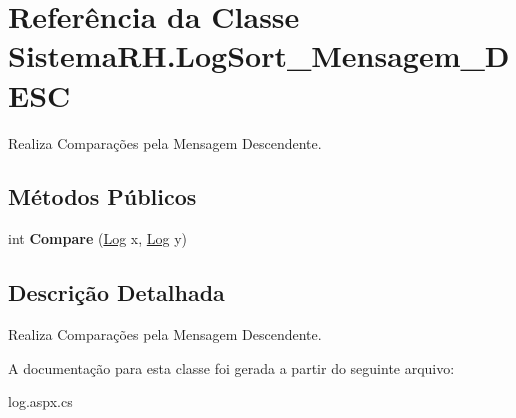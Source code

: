 \hypertarget{class_sistema_r_h_1_1_log_sort___mensagem___d_e_s_c}{
\section{Referência da Classe SistemaRH.LogSort\_\-Mensagem\_\-DESC}
\label{class_sistema_r_h_1_1_log_sort___mensagem___d_e_s_c}
}


Realiza Comparações pela Mensagem Descendente.  


\subsection*{Métodos Públicos}
\begin{DoxyCompactItemize}
\item 
\hypertarget{class_sistema_r_h_1_1_log_sort___mensagem___d_e_s_c_ad58529819fbe5728328110476bd18cb6}{
int {\bfseries Compare} (\hyperlink{class_sistema_r_h_1_1_log}{Log} x, \hyperlink{class_sistema_r_h_1_1_log}{Log} y)}
\label{class_sistema_r_h_1_1_log_sort___mensagem___d_e_s_c_ad58529819fbe5728328110476bd18cb6}

\end{DoxyCompactItemize}


\subsection{Descrição Detalhada}
Realiza Comparações pela Mensagem Descendente. 

A documentação para esta classe foi gerada a partir do seguinte arquivo:\begin{DoxyCompactItemize}
\item 
log.aspx.cs\end{DoxyCompactItemize}
